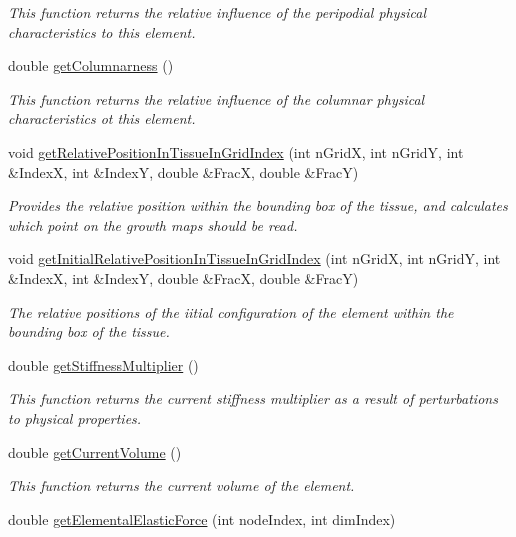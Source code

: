 \begin{DoxyCompactItemize}
\begin{DoxyCompactList}\small\item\em This function returns the relative influence of the peripodial physical characteristics to this element. \end{DoxyCompactList}\item 
\hypertarget{classShapeBase_a44c758ac93865a1e51e63212ebfe2787}{}double \hyperlink{classShapeBase_a44c758ac93865a1e51e63212ebfe2787}{get\+Columnarness} ()\label{classShapeBase_a44c758ac93865a1e51e63212ebfe2787}

\begin{DoxyCompactList}\small\item\em This function returns the relative influence of the columnar physical characteristics ot this element. \end{DoxyCompactList}\item 
void \hyperlink{classShapeBase_a13cf955dcc9db425c762053468578d72}{get\+Relative\+Position\+In\+Tissue\+In\+Grid\+Index} (int n\+Grid\+X, int n\+Grid\+Y, int \&Index\+X, int \&Index\+Y, double \&Frac\+X, double \&Frac\+Y)
\begin{DoxyCompactList}\small\item\em Provides the relative position within the bounding box of the tissue, and calculates which point on the growth maps should be read. \end{DoxyCompactList}\item 
void \hyperlink{classShapeBase_a2e91ece1ff8f6cfa8d8c495a3afc59c5}{get\+Initial\+Relative\+Position\+In\+Tissue\+In\+Grid\+Index} (int n\+Grid\+X, int n\+Grid\+Y, int \&Index\+X, int \&Index\+Y, double \&Frac\+X, double \&Frac\+Y)
\begin{DoxyCompactList}\small\item\em The relative positions of the iitial configuration of the element within the bounding box of the tissue. \end{DoxyCompactList}\item 
\hypertarget{classShapeBase_aedf8b080646ee417af28e94f5857aa17}{}double \hyperlink{classShapeBase_aedf8b080646ee417af28e94f5857aa17}{get\+Stiffness\+Multiplier} ()\label{classShapeBase_aedf8b080646ee417af28e94f5857aa17}

\begin{DoxyCompactList}\small\item\em This function returns the current stiffness multiplier as a result of perturbations to physical properties. \end{DoxyCompactList}\item 
double \hyperlink{classShapeBase_a438155adad0f124efa714b349830437b}{get\+Current\+Volume} ()
\begin{DoxyCompactList}\small\item\em This function returns the current volume of the element. \end{DoxyCompactList}\item 
\hypertarget{classShapeBase_adf6c972d40af4b6709481f63903c4342}{}double \hyperlink{classShapeBase_adf6c972d40af4b6709481f63903c4342}{get\+Elemental\+Elastic\+Force} (int node\+Index, int dim\+Index)\label{classShapeBase_adf6c972d40af4b6709481f63903c4342}


\end{DoxyCompactItemize}
